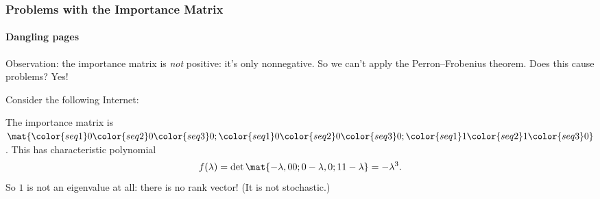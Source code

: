 \begin{frame}
\frametitle{Problems with the Importance Matrix}
\framesubtitle{Dangling pages}

\alert{Observation:} the importance matrix is \emph{not} positive: it's only
nonnegative.
\pause
So we can't apply the Perron--Frobenius theorem.
\pause
Does this cause problems?
\pause
Yes!

\pause\medskip
Consider the following Internet:
\begin{center}
\end{center}
\pause
The importance matrix is
\pause
$\def\r{\color{seq1}}\def\b{\color{seq2}}\def\g{\color{seq3}}
\mat{\r0 \b0 \g0; \r0 \b0 \g0; \r1 \b1 \g0}$.
\pause
This has characteristic polynomial
\[ f(\lambda) = \det\mat{-\lambda, 0 0; 0 -\lambda, 0; 1 1 -\lambda}
= -\lambda^3. \]
\pause
So $1$ is not an eigenvalue at all: there is no rank vector!
(It is not stochastic.)

\end{frame}



